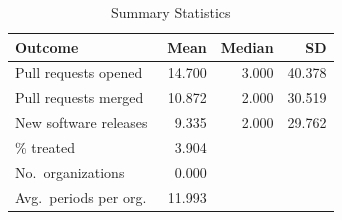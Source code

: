 \begin{table}[H]
  \centering
  \caption{Summary Statistics}
  \label{tab:outcome_summary}
\begin{tabular}{lrrr}
\toprule
Outcome & Mean & Median & SD \\
\midrule
Pull requests opened  & 14.700 & 3.000 & 40.378 \\
Pull requests merged  & 10.872 & 2.000 & 30.519 \\
New software releases & 9.335 & 2.000 & 29.762 \\
\midrule
\% treated            & 3.904 & & \\
No.\ organizations    & 0.000 & & \\
Avg.\ periods per org.\ & 11.993 & & \\
\bottomrule
\end{tabular}
\end{table}
